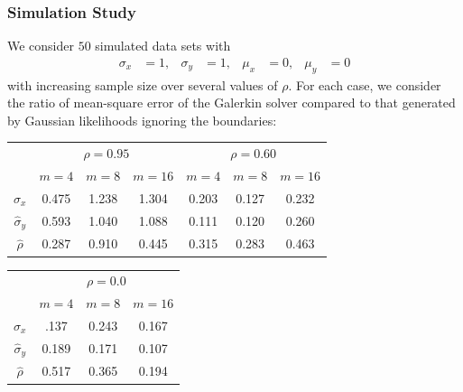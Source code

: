 \documentclass{beamer}
\begin{document}
\begin{frame}
  \frametitle{Simulation Study} We consider $50$ simulated data sets with
  \begin{align*}
    \sigma_x &= 1, & \sigma_y &= 1, & \mu_x &= 0, & \mu_y &= 0
  \end{align*}
  with increasing sample size over several values of $\rho$. For each
  case, we consider the ratio of mean-square error of the Galerkin
  solver compared to that generated by Gaussian likelihoods ignoring the boundaries:
  \begin{table}  
  \centering
  \begin{tabular}{cccc|ccc}
    &  \multicolumn{3}{c}{$\rho=0.95$} & \multicolumn{3}{c}{$\rho=0.60$} \\
    & $m=4$ & $m=8$ & $m=16$ & $m=4$ & $m=8$ & $m=16$ \\
    \hline
    $\hat{\sigma}_x$ & 0.475 & 1.238 & 1.304 & 0.203 & 0.127 & 0.232   \\
    \hline
    $\hat{\sigma}_y$ & 0.593 & 1.040 & 1.088 &  0.111 & 0.120 & 0.260 \\
    \hline
    $\hat{\rho}$ & 0.287 & 0.910 & 0.445 & 0.315 & 0.283 & 0.463 
  \end{tabular}
\end{table}

  \begin{table}  
  \centering
  \begin{tabular}{cccc}
    & \multicolumn{3}{c}{$\rho=0.0$}\\
    & $m=4$ & $m=8$ & $m=16$ \\
    \hline
    $\hat{\sigma}_x$ & .137 & 0.243 & 0.167 \\
    \hline
    $\hat{\sigma}_y$ &  0.189 & 0.171 & 0.107 \\
    \hline
    $\hat{\rho}$ &  0.517 & 0.365 & 0.194
  \end{tabular}
  \end{table}

\end{frame}
\end{document}
